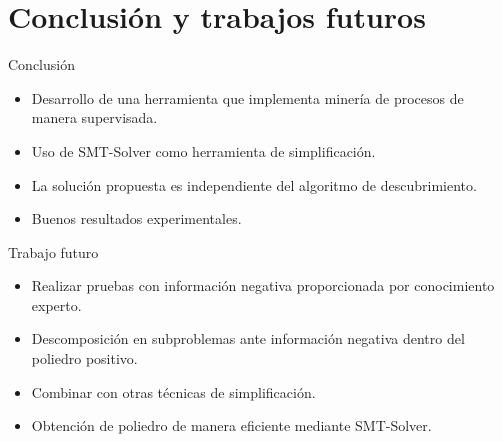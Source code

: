 \documentclass[spanish,pdf]{beamer}
\begin{document}
%  

\section{Conclusión y trabajos futuros}
\begin{frame}{Conclusión}{}
\begin{itemize}
  \item Desarrollo de una herramienta que implementa minería de procesos de manera supervisada.

  \item Uso de SMT-Solver como herramienta de simplificación.

  \item La solución propuesta es independiente del algoritmo de descubrimiento.

  \item Buenos resultados experimentales.
\end{itemize}    
\end{frame}

\begin{frame}{Trabajo futuro}{}
\begin{itemize}
  \item Realizar pruebas con información negativa proporcionada por conocimiento experto.

  \item Descomposición en subproblemas ante información negativa dentro del poliedro positivo.

  \item Combinar con otras técnicas de simplificación.

  \item Obtención de poliedro de manera eficiente mediante SMT-Solver.
\end{itemize}                         
\end{frame}
\end{document}
